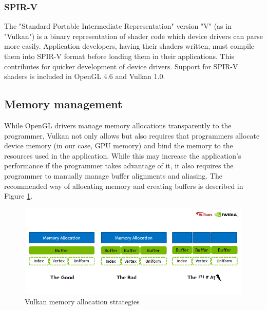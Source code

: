 \subsubsection{SPIR-V}
The "Standard Portable Intermediate Representation" version "V" (as in "Vulkan") is a binary representation of shader code which device drivers can parse more easily. Application developers, having their shaders written, must compile them into SPIR-V format before loading them in their applications. This contributes for quicker development of device drivers. Support for SPIR-V shaders is included in OpenGL 4.6 and Vulkan 1.0.

\subsection{Memory management}
While OpenGL drivers manage memory allocations transparently to the programmer, Vulkan not only allows but also requires that programmers allocate device memory (in our case, GPU memory) and bind the memory to the resources used in the application. While this may increase the application's performance if the programmer takes advantage of it, it also requires the programmer to manually manage buffer alignments and aliasing.  The recommended way of allocating memory and creating buffers is described in Figure \ref{fig:vulkan_mem_alloc}.

\begin{figure}[ht]
    \centering
    \includegraphics[width = 15cm]{figs/vulkan_memory_strategy.png}
    \caption{Vulkan memory allocation strategies}
    \label{fig:vulkan_mem_alloc}
\end{figure}

